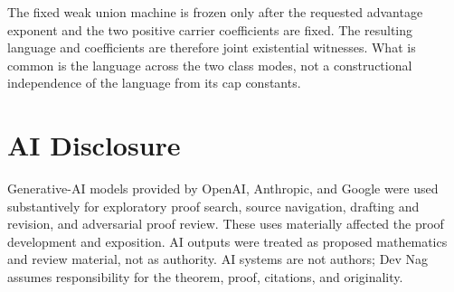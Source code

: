 \documentclass[11pt,letterpaper]{article}
\theoremstyle{definition}
\theoremstyle{remark}
\begin{document}
The fixed weak union machine is frozen only after the requested
advantage exponent and the two positive carrier coefficients are fixed.
The resulting language and coefficients are therefore joint existential
witnesses. What is common is the language across the two class modes,
not a constructional independence of the language from its cap
constants.

\section*{AI Disclosure}

Generative-AI models provided by OpenAI, Anthropic, and Google were used
substantively for exploratory proof search, source navigation, drafting
and revision, and adversarial proof review. These uses materially affected
the proof development and exposition. AI outputs were treated as proposed
mathematics and review material, not as authority. AI systems are not
authors; Dev Nag assumes responsibility for the theorem, proof, citations,
and originality.
\end{document}
